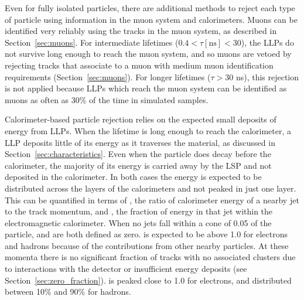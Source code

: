 Even for fully isolated particles, there are additional methods to reject each type of particle using information in the muon system and calorimeters.
Muons can be identified very reliably using the tracks in the muon system, as described in Section~\ref{sec:muons}.
For intermediate lifetimes ($0.4 < \tau [\mathrm{ns}] < 30$), the \acp{LLP} do not survive long enough to reach the muon system, and so muons are vetoed by rejecting tracks that associate to a muon with medium muon identification requirements (Section~\ref{sec:muons}).
For longer lifetimes ($\tau > 30$ ns), this rejection is not applied because \acp{LLP} which reach the muon system can be identified as muons as often as 30\% of the time in simulated samples.

Calorimeter-based particle rejection relies on the expected small deposits of energy from \acp{LLP}. 
When the lifetime is long enough to reach the calorimeter, a \ac{LLP} deposits little of its energy as it traverses the material, as discussed in Section~\ref{sec:characteristics}. 
Even when the particle does decay before the calorimeter, the majority of its energy is carried away by the \ac{LSP} and not deposited in the calorimeter.
In both cases the energy is expected to be distributed across the layers of the calorimeters and not peaked in just one layer. 
This can be quantified in terms of \ep, the ratio of calorimeter energy of a nearby jet to the track momentum, and \emfrac, the fraction of energy in that jet within the electromagnetic calorimeter.
When no jets fall within a cone of 0.05 of the particle, \ep and \emfrac are both defined as zero.
\ep is expected to be above 1.0 for electrons and hadrons because of the contributions from other nearby particles.
At these momenta there is no significant fraction of tracks with no associated clusters due to interactions with the detector or insufficient energy deposits (see Section~\ref{sec:zero_fraction}). 
\emfrac is peaked close to 1.0 for electrons, and distributed between 10\% and 90\% for hadrons.

